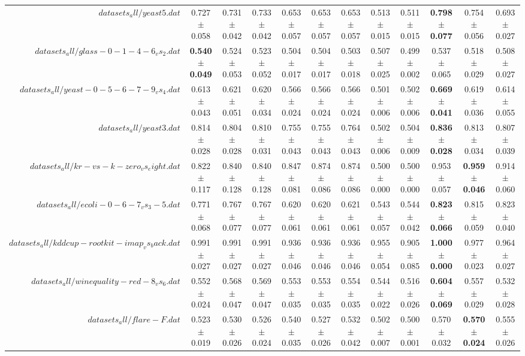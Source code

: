 \begin{table}[!ht]
{\begin{tabular}{r c c c c c c c c c c c}
$datasets_all/yeast5.dat$ & 0.727 $\pm$ 0.058 & 0.731 $\pm$ 0.042 & 0.733 $\pm$ 0.042 & 0.653 $\pm$ 0.057 & 0.653 $\pm$ 0.057 & 0.653 $\pm$ 0.057 & 0.513 $\pm$ 0.015 & 0.511 $\pm$ 0.015 & \textbf{0.798 $\pm$ 0.077} & 0.754 $\pm$ 0.056 & 0.693 $\pm$ 0.027 \\
$datasets_all/glass-0-1-4-6_vs_2.dat$ & \textbf{0.540 $\pm$ 0.049} & 0.524 $\pm$ 0.053 & 0.523 $\pm$ 0.052 & 0.504 $\pm$ 0.017 & 0.504 $\pm$ 0.017 & 0.503 $\pm$ 0.018 & 0.507 $\pm$ 0.025 & 0.499 $\pm$ 0.002 & 0.537 $\pm$ 0.065 & 0.518 $\pm$ 0.029 & 0.508 $\pm$ 0.027 \\
$datasets_all/yeast-0-5-6-7-9_vs_4.dat$ & 0.613 $\pm$ 0.043 & 0.621 $\pm$ 0.051 & 0.620 $\pm$ 0.034 & 0.566 $\pm$ 0.024 & 0.566 $\pm$ 0.024 & 0.566 $\pm$ 0.024 & 0.501 $\pm$ 0.006 & 0.502 $\pm$ 0.006 & \textbf{0.669 $\pm$ 0.041} & 0.619 $\pm$ 0.036 & 0.614 $\pm$ 0.055 \\
$datasets_all/yeast3.dat$ & 0.814 $\pm$ 0.028 & 0.804 $\pm$ 0.028 & 0.810 $\pm$ 0.031 & 0.755 $\pm$ 0.043 & 0.755 $\pm$ 0.043 & 0.764 $\pm$ 0.043 & 0.502 $\pm$ 0.006 & 0.504 $\pm$ 0.009 & \textbf{0.836 $\pm$ 0.028} & 0.813 $\pm$ 0.034 & 0.807 $\pm$ 0.039 \\
$datasets_all/kr-vs-k-zero_vs_eight.dat$ & 0.822 $\pm$ 0.117 & 0.840 $\pm$ 0.128 & 0.840 $\pm$ 0.128 & 0.847 $\pm$ 0.081 & 0.874 $\pm$ 0.086 & 0.874 $\pm$ 0.086 & 0.500 $\pm$ 0.000 & 0.500 $\pm$ 0.000 & 0.953 $\pm$ 0.057 & \textbf{0.959 $\pm$ 0.046} & 0.914 $\pm$ 0.060 \\
$datasets_all/ecoli-0-6-7_vs_3-5.dat$ & 0.771 $\pm$ 0.068 & 0.767 $\pm$ 0.077 & 0.767 $\pm$ 0.077 & 0.620 $\pm$ 0.061 & 0.620 $\pm$ 0.061 & 0.621 $\pm$ 0.061 & 0.543 $\pm$ 0.057 & 0.544 $\pm$ 0.042 & \textbf{0.823 $\pm$ 0.066} & 0.815 $\pm$ 0.059 & 0.823 $\pm$ 0.040 \\
$datasets_all/kddcup-rootkit-imap_vs_back.dat$ & 0.991 $\pm$ 0.027 & 0.991 $\pm$ 0.027 & 0.991 $\pm$ 0.027 & 0.936 $\pm$ 0.046 & 0.936 $\pm$ 0.046 & 0.936 $\pm$ 0.046 & 0.955 $\pm$ 0.054 & 0.905 $\pm$ 0.085 & \textbf{1.000 $\pm$ 0.000} & 0.977 $\pm$ 0.023 & 0.964 $\pm$ 0.027 \\
$datasets_all/winequality-red-8_vs_6.dat$ & 0.552 $\pm$ 0.024 & 0.568 $\pm$ 0.047 & 0.569 $\pm$ 0.047 & 0.553 $\pm$ 0.035 & 0.553 $\pm$ 0.035 & 0.554 $\pm$ 0.035 & 0.544 $\pm$ 0.022 & 0.516 $\pm$ 0.026 & \textbf{0.604 $\pm$ 0.069} & 0.557 $\pm$ 0.029 & 0.532 $\pm$ 0.028 \\
$datasets_all/flare-F.dat$ & 0.523 $\pm$ 0.019 & 0.530 $\pm$ 0.026 & 0.526 $\pm$ 0.024 & 0.540 $\pm$ 0.035 & 0.527 $\pm$ 0.026 & 0.532 $\pm$ 0.042 & 0.502 $\pm$ 0.007 & 0.500 $\pm$ 0.001 & 0.570 $\pm$ 0.032 & \textbf{0.570 $\pm$ 0.024} & 0.555 $\pm$ 0.026 \\

\end{tabular}}
\end{table}
